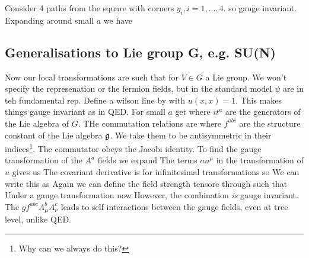 \documentclass{article}
\begin{document}
\begin{example}
Consider 4 paths from the square with corners $y_i, i=1,\dots,4$. 
so gauge invariant. Expanding around small $a$ we have 
\end{example}
\subsection{Generalisations to Lie group G, e.g. SU(N)}
Now our local transformations are such that 
for $V\in G$ a Lie group. We won't specify the represenation or the fermion fields, but in the standard model $\psi$ are in teh fundamental rep. Define a wilson line by 
with $u(x,x)=1$. This makes things gauge invariant as in QED. For small $a$ get 
where $it^a$ are the generators of the Lie algebra of $G$. THe commutation relations are 
where $f^{abc}$ are the structure constant of the Lie algebra $\mathfrak{g}$. We take them to be antisymmetric in their indices\footnote{Why can we always do this?}. The commutator obeys the Jacobi identity. To find the gauge transformation of the $A^a$ fields we expand 
The terms $an^\mu$ in the transformation of $u$ gives us 
The covariant derivative is 
for infinitesimal transformations 
so 
We can write this as 
Again we can define the field strength tensore through 
such that 
Under a gauge transformation now 
However, the combination 
\emph{is} gauge invariant. The $g f^{abc} A_\mu^b A_\nu^c$ leads to self interactions between the gauge fields, even at tree level, unlike QED.
\end{document}
